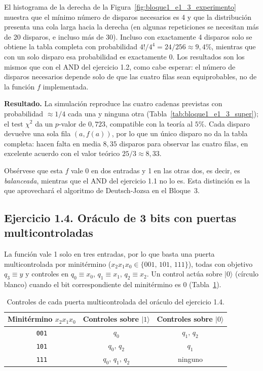 El histograma de la derecha de la Figura~\ref{fig:bloque1_e1_3_experimento} muestra que el mínimo número de disparos necesarios es 4 y que la distribución presenta una cola larga hacia la derecha
(en algunas repeticiones se necesitan más de 20 disparos, e incluso más de 30). Incluso con exactamente 4 disparos solo se obtiene la tabla completa con probabilidad
$4!/4^4=24/256\approx 9{,}4\%$, mientras que con un solo disparo esa probabilidad es exactamente 0. Los resultados son los mismos que con el AND del ejercicio 1.2, como cabe esperar:
el número de disparos necesarios depende solo de que las cuatro filas sean equiprobables, no de la función $f$ implementada.

\textbf{Resultado.} La simulación reproduce las cuatro cadenas previstas con probabilidad $\approx 1/4$ cada una y ninguna otra (Tabla~\ref{tab:bloque1_e1_3_super});
el test $\chi^2$ da un $p$-valor de $0{,}723$, compatible con la teoría al $5\%$. Cada disparo devuelve una sola fila $(a,f(a))$, por lo que un único disparo no da la tabla completa:
hacen falta en media $8{,}35$ disparos para observar las cuatro filas, en excelente acuerdo con el valor teórico $25/3\approx8{,}33$.

Obsérvese que esta $f$ vale 0 en dos entradas y 1 en las otras dos, es decir, es \emph{balanceada}, mientras que el AND del ejercicio 1.1 no lo es.
Esta distinción es la que aprovechará el algoritmo de Deutsch-Jozsa en el Bloque~3.

\subsection{Ejercicio 1.4. Oráculo de 3 bits con puertas multicontroladas}
La función vale 1 solo en tres entradas, por lo que basta una puerta multicontrolada por minitérmino ($x_2x_1x_0\in\{001,\,101,\,111\}$), todas con objetivo
$q_3\equiv y$ y controles en $q_0\equiv x_0$, $q_1\equiv x_1$, $q_2\equiv x_2$. Un control actúa sobre $|0\rangle$ (círculo blanco) cuando el bit correspondiente
del minitérmino es 0 (Tabla~\ref{tab:bloque1_e1_4_minterminos}).

\begin{table}[h]
    \centering
    \begin{tabular}{c|c|c}
    \hline
    Minitérmino $x_2x_1x_0$ & Controles sobre $|1\rangle$ & Controles sobre $|0\rangle$ \\
    \hline
    \texttt{001} & $q_0$ & $q_1,\,q_2$ \\
    \texttt{101} & $q_0,\,q_2$ & $q_1$ \\
    \texttt{111} & $q_0,\,q_1,\,q_2$ & ninguno \\
    \hline
    \end{tabular}
    \caption{Controles de cada puerta multicontrolada del oráculo del ejercicio 1.4.}\label{tab:bloque1_e1_4_minterminos}
\end{table}

